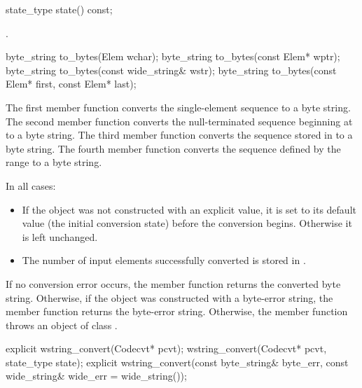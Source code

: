 %
\begin{itemdecl}
state_type state() const;
\end{itemdecl}

\begin{itemdescr}
\pnum
\returns
{}.
\end{itemdescr}

%
\begin{itemdecl}
byte_string to_bytes(Elem wchar);
byte_string to_bytes(const Elem* wptr);
byte_string to_bytes(const wide_string& wstr);
byte_string to_bytes(const Elem* first, const Elem* last);
\end{itemdecl}

\begin{itemdescr}
\pnum
\effects
The first member function converts the single-element sequence  to a byte string.
The second member function converts the null-terminated sequence beginning at  to
a byte string. The third member function converts the sequence stored in  to a
byte string. The fourth member function converts the sequence defined by the
range  to a byte string.

\pnum
In all cases:

\begin{itemize}
\item If the  object was not constructed with an explicit value,
it is set to its default value (the initial conversion state) before the
conversion begins. Otherwise it is left unchanged.
\item The number of input elements successfully converted is stored
in .
\end{itemize}

\pnum
\returns
If no conversion error occurs, the member function returns the converted byte string.
Otherwise, if the object was constructed with a byte-error string, the
member function returns the byte-error string.
Otherwise, the member function throws an object of class .
\end{itemdescr}

%
\begin{itemdecl}
explicit wstring_convert(Codecvt* pcvt);
wstring_convert(Codecvt* pcvt, state_type state);
explicit wstring_convert(const byte_string& byte_err,
    const wide_string& wide_err = wide_string());
\end{itemdecl}

